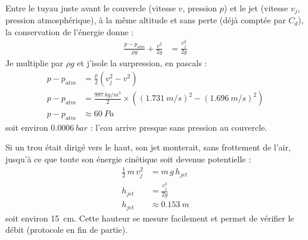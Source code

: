 \begin{demonstration}
Entre le tuyau juste avant le couvercle (vitesse $v$, pression $p$) et le jet (vitesse $v_j$, pression atmosphérique), à la même altitude et sans perte (déjà comptée par $C_d$), la conservation de l'énergie donne :
\begin{align*}
\frac{p - p_{atm}}{\rho g} + \frac{v^2}{2g} &= \frac{v_j^2}{2g}
\end{align*}
Je multiplie par $\rho g$ et j'isole la surpression, en pascals :
\begin{align*}
p - p_{atm} &= \frac{\rho}{2}\left(v_j^2 - v^2\right)\\
p - p_{atm} &= \frac{\qty{997}{kg/m^3}}{2}\times\left((\qty{1,731}{m/s})^2 - (\qty{1,696}{m/s})^2\right)\\
p - p_{atm} &\approx \qty{60}{Pa}
\end{align*}
soit environ $\qty{0,0006}{bar}$ : l'eau arrive presque sans pression au couvercle.

Si un trou était dirigé vers le haut, son jet monterait, sans frottement de l'air, jusqu'à ce que toute son énergie cinétique soit devenue potentielle :
\begin{align*}
\frac{1}{2}\,m\,v_j^2 &= m\,g\,h_{jet}\\
h_{jet} &= \frac{v_j^2}{2g}\\
h_{jet} &\approx \qty{0,153}{m}
\end{align*}
soit environ \qty{15}{cm}. Cette hauteur se mesure facilement et permet de vérifier le débit (protocole en fin de partie).
\end{demonstration}

